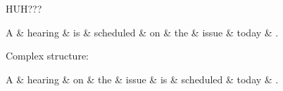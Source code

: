 \documentclass{article}
\begin{document}
HUH???
 
\begin{dependency}[theme = simple]
   \begin{deptext}[column sep=1em]
      A \& hearing \& is \& scheduled \& on \& the \& issue \& today \& . \\
   \end{deptext}
\end{dependency}

Complex structure:              %
\begin{dependency}[theme = simple]
\begin{deptext}[column sep=1em]
     A \& hearing \& on \& the \& issue \& is \& scheduled \& today \&
.  \\
\end{deptext}
\end{dependency}
\end{document}
